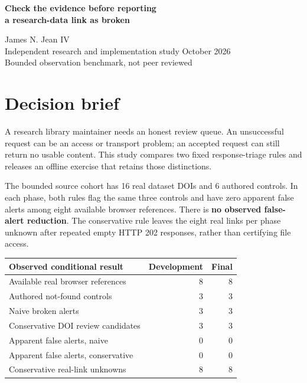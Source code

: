 \documentclass[11pt]{article}
\newcommand{\MRealPairs}{16}
\newcommand{\MControls}{6}
\newcommand{\MDevReal}{8}
\newcommand{\MDevControls}{3}
\newcommand{\MDevNaiveAlerts}{3}
\newcommand{\MDevReviewCandidates}{3}
\newcommand{\MDevNaiveFalse}{0}
\newcommand{\MDevConservativeFalse}{0}
\newcommand{\MDevUnknown}{8}
\newcommand{\MFinalReal}{8}
\newcommand{\MFinalControls}{3}
\newcommand{\MFinalNaiveAlerts}{3}
\newcommand{\MFinalReviewCandidates}{3}
\newcommand{\MFinalNaiveFalse}{0}
\newcommand{\MFinalConservativeFalse}{0}
\newcommand{\MFinalUnknown}{8}
\begin{document}
\begin{center}
{\LARGE\bfseries Check the evidence before reporting\\a research-data link as broken}\par
\vspace{8pt}James N. Jean IV\\
Independent research and implementation study October 2026\\
{\small Bounded observation benchmark, not peer reviewed}
\end{center}
\section*{Decision brief}
A research library maintainer needs an honest review queue. An unsuccessful request can be an access or transport problem; an accepted request can still return no usable content. This study compares two fixed response-triage rules and releases an offline exercise that retains those distinctions.

The bounded source cohort has \MRealPairs{} real dataset DOIs and \MControls{} authored controls. In each phase, both rules flag the same three controls and have zero apparent false alerts among eight available browser references. There is \textbf{no observed false-alert reduction}. The conservative rule leaves the eight real links per phase unknown after repeated empty HTTP 202 responses, rather than certifying file access.

\begin{center}\begin{tabular}{lrr}\toprule
Observed conditional result & Development & Final\\\midrule
Available real browser references & \MDevReal & \MFinalReal\\
Authored not-found controls & \MDevControls & \MFinalControls\\
Naive broken alerts & \MDevNaiveAlerts & \MFinalNaiveAlerts\\
Conservative DOI review candidates & \MDevReviewCandidates & \MFinalReviewCandidates\\
Apparent false alerts, naive & \MDevNaiveFalse & \MFinalNaiveFalse\\
Apparent false alerts, conservative & \MDevConservativeFalse & \MFinalConservativeFalse\\
Conservative real-link unknowns & \MDevUnknown & \MFinalUnknown\\\bottomrule
\end{tabular}\end{center}
\end{document}
